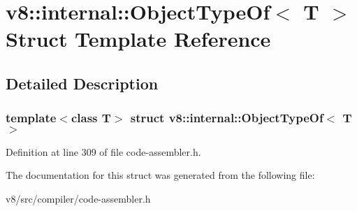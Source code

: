 \hypertarget{structv8_1_1internal_1_1ObjectTypeOf}{}\section{v8\+:\+:internal\+:\+:Object\+Type\+Of$<$ T $>$ Struct Template Reference}
\label{structv8_1_1internal_1_1ObjectTypeOf}


\subsection{Detailed Description}
\subsubsection*{template$<$class T$>$\newline
struct v8\+::internal\+::\+Object\+Type\+Of$<$ T $>$}



Definition at line 309 of file code-\/assembler.\+h.



The documentation for this struct was generated from the following file\+:\begin{DoxyCompactItemize}
\item 
v8/src/compiler/code-\/assembler.\+h\end{DoxyCompactItemize}
